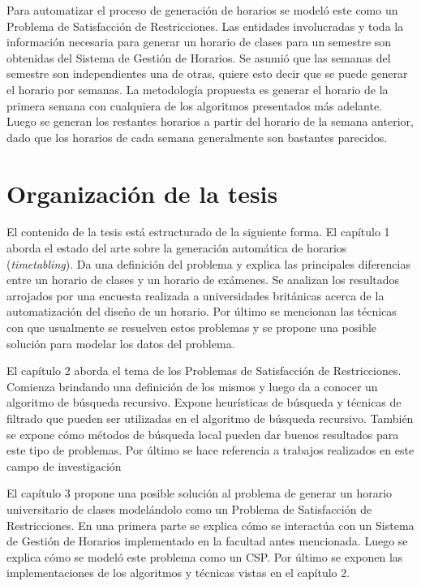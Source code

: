 \begin{introduction}
Para automatizar el proceso de generaci\'on de horarios se model\'o este como un Problema de Satisfacci\'on de Restricciones. Las entidades involucradas y toda la informaci\'on necesaria para generar un horario de clases para un semestre son obtenidas del Sistema de Gestión de Horarios. Se asumi\'o que las semanas del semestre son independientes una de otras, quiere esto decir que se puede generar el horario por semanas. La metodología propuesta es generar el horario de la primera semana con cualquiera de los algoritmos presentados más adelante. Luego se generan los restantes horarios a partir del horario de la semana anterior, dado que los horarios de cada semana generalmente son bastantes parecidos.

\section*{Organización de la tesis}

El contenido de la tesis está estructurado de la siguiente forma. El cap\'itulo 1 aborda el estado del arte sobre la generaci\'on autom\'atica de horarios (\emph{timetabling}). Da una definici\'on del problema y explica las principales diferencias entre un horario de clases y un horario de ex\'amenes. Se analizan los resultados arrojados por una encuesta realizada a universidades brit\'anicas acerca de la automatizaci\'on del diseño de un horario. Por \'ultimo se mencionan las t\'ecnicas con que usualmente se resuelven estos problemas y se propone una posible soluci\'on para modelar los datos del problema.

El cap\'itulo 2 aborda el tema de los Problemas de Satisfacci\'on de Restricciones. Comienza brindando una definici\'on de los mismos y luego da a conocer un algoritmo de b\'usqueda recursivo. Expone heur\'isticas de b\'usqueda y t\'ecnicas de filtrado que pueden ser utilizadas en el algoritmo de b\'usqueda recursivo. Tambi\'en se expone c\'omo m\'etodos de b\'usqueda local pueden dar buenos resultados para este tipo de problemas. Por \'ultimo se hace referencia a trabajos realizados en este campo de investigaci\'on 

El cap\'itulo 3 propone una posible soluci\'on al problema de generar un horario universitario de clases model\'andolo como un Problema de Satisfacci\'on de Restricciones. En una primera parte se explica c\'omo se interact\'ua con un Sistema de Gesti\'on de Horarios implementado en la facultad antes mencionada. Luego se explica c\'omo se model\'o este problema como un CSP. Por \'ultimo se exponen las implementaciones de los algoritmos y t\'ecnicas vistas en el cap\'itulo 2.


\end{introduction}
